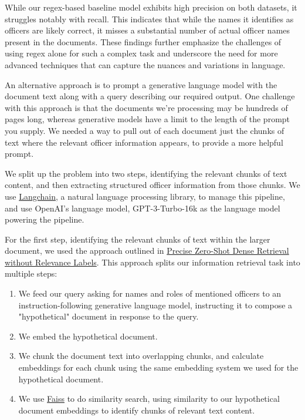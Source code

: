 \documentclass{article}
\begin{document}
While our regex-based baseline model exhibits high precision on both datasets, it struggles notably with recall. This indicates that while the names it identifies as officers are likely correct, it misses a substantial number of actual officer names present in the documents. These findings further emphasize the challenges of using regex alone for such a complex task and underscore the need for more advanced techniques that can capture the nuances and variations in language.

An alternative approach is to prompt a generative language model with the document text along with a query describing our required output. One challenge with this approach is that the documents we're processing may be hundreds of pages long, whereas generative models have a limit to the length of the prompt you supply. We needed a way to pull out of each document just the chunks of text where the relevant officer information appears, to provide a more helpful prompt.

We split up the problem into two steps, identifying the relevant chunks of text content, and then extracting structured officer information from those chunks. We use \href{https://docs.langchain.com/docs/}{Langchain}, a natural language processing library, to manage this pipeline, and use OpenAI's language model, GPT-3-Turbo-16k as the language model powering the pipeline.

For the first step, identifying the relevant chunks of text within the larger document, we used the approach outlined in \href{https://arxiv.org/abs/2212.10496}{Precise Zero-Shot Dense Retrieval without Relevance Labels}. This approach splits our information retrieval task into multiple steps:

\begin{enumerate}
    \item We feed our query asking for names and roles of mentioned officers to an instruction-following generative language model, instructing it to compose a "hypothetical" document in response to the query.
    \item We embed the hypothetical document.
    \item We chunk the document text into overlapping chunks, and calculate embeddings for each chunk using the same embedding system we used for the hypothetical document.
    \item We use \href{https://faiss.ai/}{Faiss} to do similarity search, using similarity to our hypothetical document embeddings to identify chunks of relevant text content.
\end{enumerate}
\end{document}
